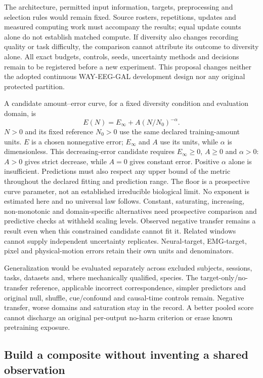 The architecture, permitted input information, targets, preprocessing and selection rules would remain fixed. Source rosters, repetitions, updates and measured computing work must accompany the results; equal update counts alone do not establish matched compute. If diversity also changes recording quality or task difficulty, the comparison cannot attribute its outcome to diversity alone. All exact budgets, controls, seeds, uncertainty methods and decisions remain to be registered before a new experiment. This proposal changes neither the adopted continuous WAY-EEG-GAL development design nor any original protected partition.

A candidate amount--error curve, for a fixed diversity condition and evaluation domain, is
\[
E(N)=E_{\infty}+A(N/N_0)^{-\alpha}.
\]
$N>0$ and its fixed reference $N_0>0$ use the same declared training-amount units. $E$ is a chosen nonnegative error; $E_{\infty}$ and $A$ use its units, while $\alpha$ is dimensionless. This decreasing-error candidate requires $E_{\infty}\geq0$, $A\geq0$ and $\alpha>0$: $A>0$ gives strict decrease, while $A=0$ gives constant error. Positive $\alpha$ alone is insufficient. Predictions must also respect any upper bound of the metric throughout the declared fitting and prediction range. The floor is a prospective curve parameter, not an established irreducible biological limit. No exponent is estimated here and no universal law follows. Constant, saturating, increasing, non-monotonic and domain-specific alternatives need prospective comparison and predictive checks at withheld scaling levels. Observed negative transfer remains a result even when this constrained candidate cannot fit it. Related windows cannot supply independent uncertainty replicates. Neural-target, EMG-target, pixel and physical-motion errors retain their own units and denominators.

Generalization would be evaluated separately across excluded subjects, sessions, tasks, datasets and, where mechanically qualified, species. The target-only/no-transfer reference, applicable incorrect correspondence, simpler predictors and original null, shuffle, cue/confound and causal-time controls remain. Negative transfer, worse domains and saturation stay in the record. A better pooled score cannot discharge an original per-output no-harm criterion or erase known pretraining exposure.

\subsection{Build a composite without inventing a shared observation}

